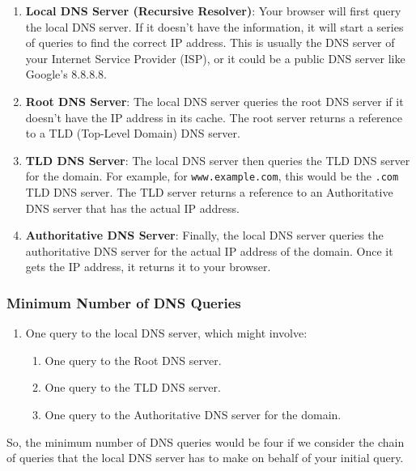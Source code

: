 \documentclass[
]{article}
\providecommand{\tightlist}{%
  \setlength{\itemsep}{0pt}\setlength{\parskip}{0pt}}
\begin{document}
\begin{enumerate}
\def\labelenumi{\arabic{enumi}.}
\item
  \textbf{Local DNS Server (Recursive Resolver)}: Your browser will
  first query the local DNS server. If it doesn't have the information,
  it will start a series of queries to find the correct IP address. This
  is usually the DNS server of your Internet Service Provider (ISP), or
  it could be a public DNS server like Google's 8.8.8.8.
\item
  \textbf{Root DNS Server}: The local DNS server queries the root DNS
  server if it doesn't have the IP address in its cache. The root server
  returns a reference to a TLD (Top-Level Domain) DNS server.
\item
  \textbf{TLD DNS Server}: The local DNS server then queries the TLD DNS
  server for the domain. For example, for \texttt{www.example.com}, this
  would be the \texttt{.com} TLD DNS server. The TLD server returns a
  reference to an Authoritative DNS server that has the actual IP
  address.
\item
  \textbf{Authoritative DNS Server}: Finally, the local DNS server
  queries the authoritative DNS server for the actual IP address of the
  domain. Once it gets the IP address, it returns it to your browser.
\end{enumerate}

\hypertarget{minimum-number-of-dns-queries}{%
\subsubsection{Minimum Number of DNS
Queries}\label{minimum-number-of-dns-queries}}

\begin{enumerate}
\def\labelenumi{\arabic{enumi}.}
\tightlist
\item
  One query to the local DNS server, which might involve:

  \begin{enumerate}
  \def\labelenumii{\arabic{enumii}.}
  \tightlist
  \item
    One query to the Root DNS server.
  \item
    One query to the TLD DNS server.
  \item
    One query to the Authoritative DNS server for the domain.
  \end{enumerate}
\end{enumerate}

So, the minimum number of DNS queries would be four if we consider the
chain of queries that the local DNS server has to make on behalf of your
initial query.
\end{document}
